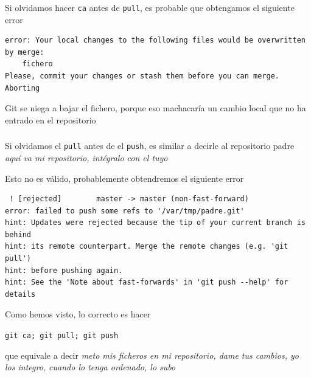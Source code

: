 \documentclass[ucs]{beamer}
\begin{document}
\begin{frame}[fragile]
\frametitle{}
Si olvidamos hacer \verb|ca| antes de \verb|pull|, es probable que 
obtengamos el siguiente error


  \begin{scriptsize}
  \begin{verbatim}
error: Your local changes to the following files would be overwritten by merge:
    fichero
Please, commit your changes or stash them before you can merge.
Aborting
  \end{verbatim}
  \end{scriptsize}
Git se niega a bajar el fichero, porque eso machacaría
un cambio local que no ha entrado en el repositorio

\end{frame}



\begin{frame}[fragile]
\frametitle{}
Si olvidamos el \verb|pull| antes de el \verb|push|, es similar
a decirle al repositorio padre 
\emph{aquí va mi repositorio, intégralo con el tuyo}

Esto no es válido, 
probablemente obtendremos el siguiente error

  \begin{scriptsize}
  \begin{verbatim}
 ! [rejected]        master -> master (non-fast-forward)
error: failed to push some refs to '/var/tmp/padre.git'
hint: Updates were rejected because the tip of your current branch is behind
hint: its remote counterpart. Merge the remote changes (e.g. 'git pull')
hint: before pushing again.
hint: See the 'Note about fast-forwards' in 'git push --help' for details
  \end{verbatim}
  \end{scriptsize}

Como hemos visto, lo correcto es hacer 

\verb|git ca; git pull; git push| 

que equivale a decir
\emph{meto mis ficheros en mi repositorio, dame tus cambios, yo los integro, cuando lo tenga ordenado,
lo subo}


\end{frame}
\end{document}
